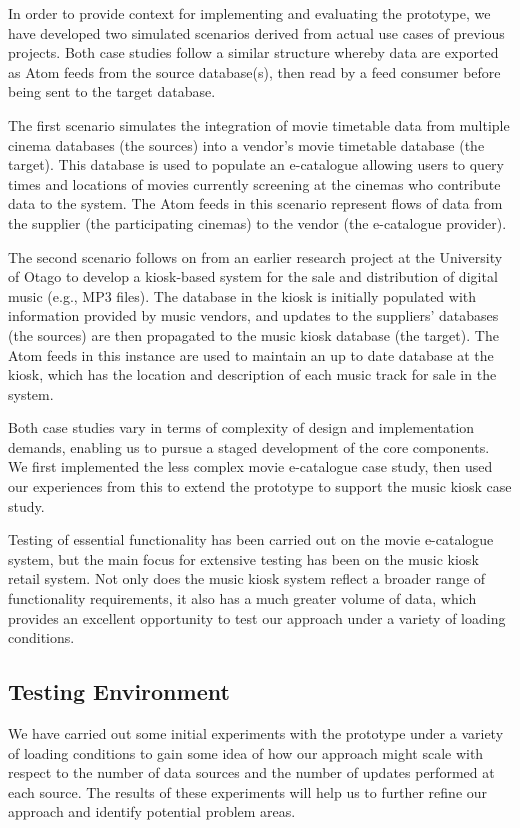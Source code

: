 \documentclass{CRPITStyle}
\begin{document}
In order to provide context for implementing and evaluating the
prototype, we have developed two simulated scenarios derived from actual
use cases of previous projects. Both case studies follow a similar
structure whereby data are exported as Atom feeds from the source
database(s), then read by a feed consumer before being sent to the
target database.

The first scenario simulates the integration of movie timetable data
from multiple cinema databases (the sources) into a vendor's movie
timetable database (the target). This database is used to populate an
e-catalogue allowing users to query times and locations of movies
currently screening at the cinemas who contribute data to the system.
The Atom feeds in this scenario represent flows of data from the
supplier (the participating cinemas) to the vendor (the e-catalogue
provider).

The second scenario follows on from an earlier research project at the
University of Otago to develop a kiosk-based system for the sale and
distribution of digital music (e.g., MP3 files). The database in the
kiosk is initially populated with information provided by music vendors,
and updates to the suppliers' databases (the sources) are then
propagated to the music kiosk database (the target). The Atom feeds in
this instance are used to maintain an up to date database at the kiosk,
which has the location and description of each music track for sale in
the system.

Both case studies vary in terms of complexity of design and
implementation demands, enabling us to pursue a staged development of
the core components. We first implemented the less complex movie
e-catalogue case study, then used our experiences from this to extend
the prototype to support the music kiosk case study.

Testing of essential functionality has been carried out on the movie
e-catalogue system, but the main focus for extensive testing has been on
the music kiosk retail system. Not only does the music kiosk system
reflect a broader range of functionality requirements, it also has a
much greater volume of data, which provides an excellent opportunity to
test our approach under a variety of loading conditions.


\subsection{Testing Environment}
\label{sec-testing}

We have carried out some initial experiments with the prototype under a
variety of loading conditions to gain some idea of how our approach
might scale with respect to the number of data sources and the number of
updates performed at each source. The results of these experiments will
help us to further refine our approach and identify potential problem
areas.
\end{document}
